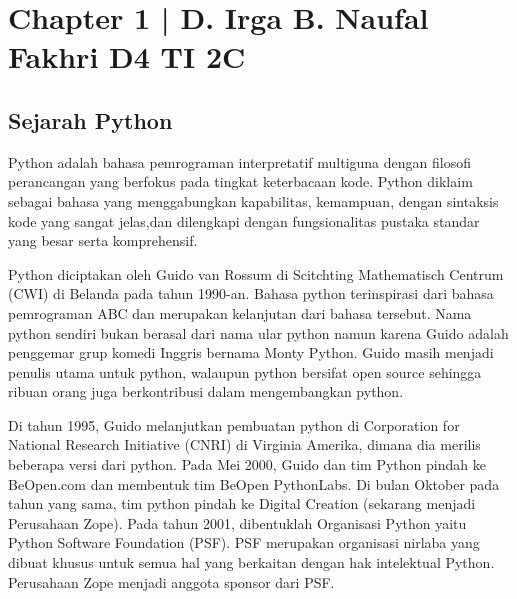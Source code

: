 \section{Chapter 1 | D. Irga B. Naufal Fakhri D4 TI 2C}
\subsection{Sejarah Python}
	Python adalah bahasa pemrograman interpretatif multiguna dengan filosofi perancangan yang berfokus pada tingkat keterbacaan kode. Python diklaim sebagai bahasa yang menggabungkan kapabilitas, kemampuan, dengan sintaksis kode yang sangat jelas,dan dilengkapi dengan fungsionalitas pustaka standar yang besar serta komprehensif. 

	Python diciptakan oleh Guido van Rossum di Scitchting Mathematisch Centrum (CWI) di Belanda pada tahun 1990-an. Bahasa python terinspirasi dari bahasa pemrograman ABC dan merupakan kelanjutan dari bahasa tersebut. Nama python sendiri bukan berasal dari nama ular python namun karena Guido adalah penggemar grup komedi Inggris bernama Monty Python. Guido masih menjadi penulis utama untuk python, walaupun python bersifat open source sehingga ribuan orang juga berkontribusi dalam mengembangkan python.

	Di tahun 1995, Guido melanjutkan pembuatan python di Corporation for National Research Initiative (CNRI) di Virginia Amerika, dimana dia merilis beberapa versi dari python.
Pada Mei 2000, Guido dan tim Python pindah ke BeOpen.com dan membentuk tim BeOpen PythonLabs. Di bulan Oktober pada tahun yang sama, tim python pindah ke Digital Creation (sekarang menjadi Perusahaan Zope). Pada tahun 2001, dibentuklah Organisasi Python yaitu Python Software Foundation (PSF). PSF merupakan organisasi nirlaba yang dibuat khusus untuk semua hal yang berkaitan dengan hak intelektual Python. Perusahaan Zope menjadi anggota sponsor dari PSF.

